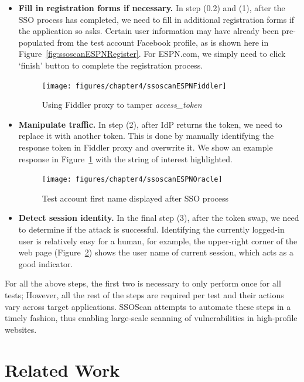 \begin{itemize}
\item \textbf{Fill in registration forms if necessary.}  In step (0.2) and (1), after the SSO process has completed, we need to fill in additional registration forms if the application so asks.  Certain user information may have already been pre-populated from the test account Facebook profile, as is shown here in Figure~\ref{fig:ssoscanESPNRegister}.  For ESPN.com, we simply need to click `finish' button to complete the registration process.

\begin{figure}[bht]
\centering
\texttt{[image: figures/chapter4/ssoscanESPNFiddler]}
\caption{Using Fiddler proxy to tamper \emph{access\_token}}
\label{fig:ssoscanESPNFiddler}
\end{figure}

\item \textbf{Manipulate traffic.} In step (2), after IdP returns the token, we need to replace it with another token.  This is done by manually identifying the response token in Fiddler proxy and overwrite it.  We show an example response in Figure~\ref{fig:ssoscanESPNFiddler} with the string of interest highlighted.

\begin{figure}[hbt]
\centering
\texttt{[image: figures/chapter4/ssoscanESPNOracle]}
\caption{Test account first name displayed after SSO process}
\label{fig:ssoscanESPNOracle}
\end{figure}

\item \textbf{Detect session identity.}  In the final step (3), after the token swap, we need to determine if the attack is successful.  Identifying the currently logged-in user is relatively easy for a human, for example, the upper-right corner of the web page (Figure~\ref{fig:ssoscanESPNOracle}) shows the user name of current session, which acts as a good indicator.

\end{itemize}

For all the above steps, the first two is necessary to only perform once for all tests;  However, all the rest of the steps are required per test and their actions vary across target applications.  SSOScan attempts to automate these steps in a timely fashion, thus enabling large-scale scanning of vulnerabilities in high-profile websites.  

\section{Related Work}
\label{sec:ssoscanRelatedWork}

